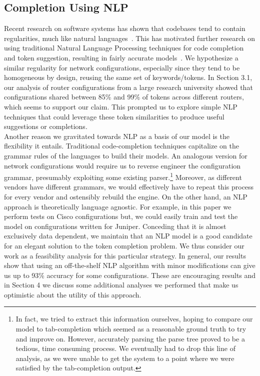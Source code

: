 \subsection{Completion Using NLP}
Recent research on software systems has shown that codebases tend to contain regularities, much like natural languages~\cite{naturalness}. This has motivated further research on using traditional Natural Language Processing techniques for code completion and token suggestion, resulting in fairly accurate models~\cite{naturalness, raychev}. We hypothesize a similar regularity for network configurations, especially since they tend to be homogeneous by design, reusing the same set of keywords/tokens. In Section 3.1, our analysis of router configurations from a large research university showed that configurations shared between 85\% and 99\% of tokens across different routers, which seems to support our claim. This prompted us to explore simple NLP techniques that could leverage these token similarities to produce useful suggestions or completions.\\

Another reason we gravitated towards NLP as a basis of our model is the flexibility it entails. Traditional code-completion techniques capitalize on the grammar rules of the languages to build their models. An analogous version for network configurations would require us to reverse engineer the configuration grammar, presumably exploiting some existing parser.\footnote{In fact, we tried to extract this information ourselves, hoping to compare our model to tab-completion which seemed as a reasonable ground truth to try and improve on. However, accurately parsing the parse tree proved to be a tedious, time consuming process. We eventually had to drop this line of analysis, as we were unable to get the system to a point where we were satisfied by the tab-completion output.}
Moreover, as different vendors have different grammars, we would effectively have to repeat this process for every vendor and ostensibly rebuild the engine. On the other hand, an NLP approach is theoretically language agnostic. For example, in this paper we perform tests on Cisco configurations but, we could easily train and test the model on configurations written for Juniper. Conceding that it is almost exclusively data dependent, we maintain that an NLP model is a good candidate for an elegant solution to the token completion problem. We thus consider our work as a feasibility analysis for this particular strategy. In general, our results show that using an off-the-shelf NLP algorithm with minor modifications can give us up to 93\% accuracy for some configurations. These are encouraging results and in Section 4 we discuss some additional analyses we performed that make us optimistic about the utility of this approach.\\

